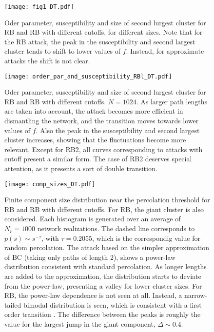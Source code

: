 \documentclass{article}
\begin{document}
\begin{figure}
\centering
\texttt{[image: fig1\_DT.pdf]}
\caption{Oder parameter, susceptibility and size of second lurgest cluster for RB and RB with different cutoffs, for different sizes. Note that for the RB attack, the peak in the susceptibility and second largest cluster tends to shift to lower values of $f$. Instead, for approximate attacks the shift is not clear.}
\end{figure}

\begin{figure}
\centering
\texttt{[image: order\_par\_and\_susceptibility\_RBl\_DT.pdf]}
\caption{Oder parameter, susceptibility and size of second lurgest cluster for RB and RB with different cutoffs. $N = 1024$. As larger path lengths are taken into account, the attack becomes more efficient in dismantling the network, and the transition moves towards lower values of $f$. Also the peak in the susceptibility and second largest cluster increases, showing that the fluctuations become more relevant. Except for RB2, all curves corresponding to attacks with cutoff present a similar form. The case of RB2 deserves special attention, as it presents a sort of double transition.}
\end{figure}





\begin{figure}
\centering
\texttt{[image: comp\_sizes\_DT.pdf]}
\caption{Finite component size distribution near the percolation threshold for RB and RB with different cutoffs. For RB, the giant cluster is also considered. Each histogram is generated over an average of $N_r = 1000$ network realizations. The dashed line corresponds to $p(s) \sim s^{-\tau}$, with $\tau = 0.2055$, which is the correspondig value for random percolation. The attack based on the simpler approximation of BC (taking only paths of length 2), shows a power-law distribution consistent with standard percolation. As longer lengths are added to the approximation, the distribution starts to deviate from the power-law, presenting a valley for lower cluster sizes. For RB, the power-law dependence is not seen at all. Instead, a narrow-tailed bimodal distribution is seen, which is consistent with a first order transition \cite{Araujo2010,Binder1992} . The difference between the peaks is roughly the value for the largest jump in the giant component, $\Delta\sim 0.4$. }
\end{figure}
\end{document}
